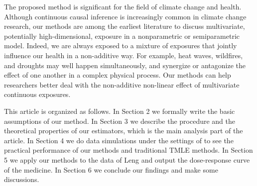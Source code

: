 \documentclass[11pt]{article}
\numberwithin{equation}{section}
\theoremstyle{definition}
\begin{document}
The proposed method is significant for the field of climate change and health. Although continuous causal inference is increasingly common in climate change research, our methods are among the earliest literature to discuss multivariate, potentially high-dimensional, exposure in a nonparametric or semiparametric model. Indeed, we are always exposed to a mixture of exposures that jointly influence our health in a non-additive way. For example, heat waves, wildfires, and droughts may well happen simultaneously, and synergize or antagonize the effect of one another in a complex physical process. %
Our methods can help researchers better deal with the non-additive non-linear effect of multivariate continuous exposures. %


This article is organized as follows. In Section 2 we formally write the basic assumptions of our method. In Section 3 we describe the procedure and the theoretical properties of our estimators, which is the main analysis part of the article. In Section 4 we do data simulations under the settings of \cite{mccoy2023semi} to see the practical performance of our methods and traditional TMLE methods. In Section 5 we apply our methods to the data of Leng and output the dose-response curve of the medicine. In Section 6 we conclude our findings and make some discussions.
\end{document}
